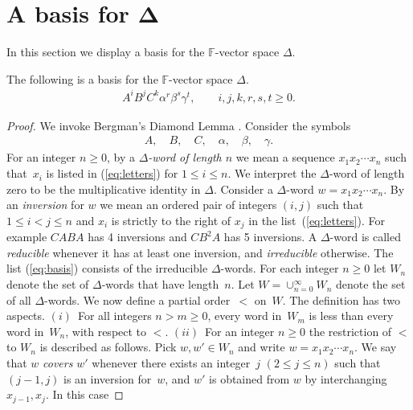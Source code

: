 \section[A basis for $\Delta $]{A basis for $\boldsymbol{\Delta}$}

 In this section we display a basis for the $\mathbb F$-vector
space $\Delta $.

\begin{Theorem}
\label{thm:basis}
The following is a basis for the $\mathbb F$-vector
space $ \Delta $.
\begin{gather}
\label{eq:basis}
A^iB^jC^k \alpha^r\beta^s\gamma^t, \qquad   i,j,k,r,s,t \geq 0.
\end{gather}
\end{Theorem}

\begin{proof}
We invoke  Bergman's Diamond Lemma
\cite[Theorem~1.2]{berg}.
Consider the symbols
\begin{gather}
\label{eq:letters}
A, \quad B, \quad C, \quad \alpha,\quad \beta, \quad \gamma.
\end{gather}
For an integer $n \geq 0$, by a {\it $\Delta $-word of length $n$}
we mean a sequence
 $x_1x_2\cdots x_n$ such that~$x_i$ is listed in
(\ref{eq:letters}) for $1 \leq i \leq n$.
We interpret the
$\Delta $-word
of length zero to be the multiplicative
identity in $\Delta $.
Consider a
 $\Delta $-word
$w=x_1x_2\cdots x_n$.
By an {\it inversion} for $w$
we mean an ordered pair of integers $(i,j)$
such that
$1\leq i<j\leq n$ and
$x_i$ is strictly to the right of
$x_j$ in the list~(\ref{eq:letters}).
For example $CABA$ has 4 inversions
and
$CB^2A$ has 5 inversions.
A $\Delta $-word is called {\it reducible} whenever it has at least one
inversion, and {\it irreducible} otherwise.
The list
(\ref{eq:basis}) consists of the irreducible $\Delta $-words.
For each integer $n\geq 0$ let
$W_n$ denote the set of $\Delta $-words that have
length~$n$.
Let $W=\cup_{n=0}^\infty W_n$ denote the
set of all
$\Delta $-words.
We now def\/ine a partial
order~$<$ on~$W$.
The def\/inition has two aspects.
$(i)$~For all integers  $n> m\geq 0$,
every word in~$W_m$ is less than
every word in~$W_n$, with respect to $<$.
$(ii)$~For an integer $n\geq 0$
the restriction of $<$ to $W_n$ is
described as follows.
Pick $w, w' \in
 W_n$ and write
 $w=x_1x_2\cdots x_n$.
We say that $w$ {\it covers} $w'$ whenever
there exists an integer~$j$ $(2 \leq j \leq n)$
such that $(j-1,j)$ is an inversion for~$w$,
and
$w'$ is obtained from $w$ by interchanging
$x_{j-1},x_j$.
In this case

\end{proof}
